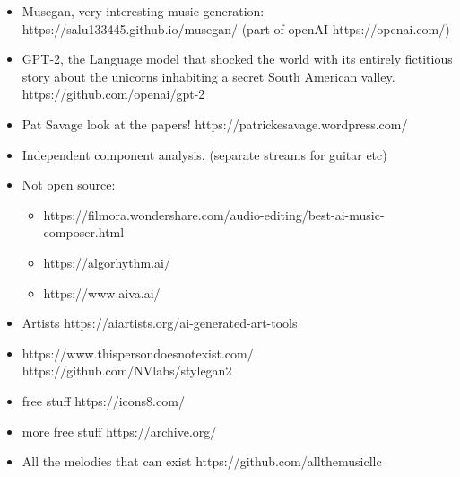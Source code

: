 \documentclass[a4paper,10pt]{article}
\begin{document}
\begin{itemize}
 \item Musegan, very interesting music generation: https://salu133445.github.io/musegan/ (part of openAI https://openai.com/)
 \item GPT-2, the Language model that shocked the world with its entirely fictitious story about the unicorns inhabiting a secret South American valley. https://github.com/openai/gpt-2
 \item Pat Savage look at the papers! https://patrickesavage.wordpress.com/
 \item Independent component analysis. (separate streams for guitar etc)
 \item Not open source:
 \begin{itemize}
  \item https://filmora.wondershare.com/audio-editing/best-ai-music-composer.html
  \item https://algorhythm.ai/
  \item https://www.aiva.ai/
 \end{itemize}
 \item Artists https://aiartists.org/ai-generated-art-tools
 \item https://www.thispersondoesnotexist.com/ https://github.com/NVlabs/stylegan2
 \item free stuff https://icons8.com/
 \item more free stuff https://archive.org/
 \item All the melodies that can exist https://github.com/allthemusicllc
\end{itemize}


\end{document}
